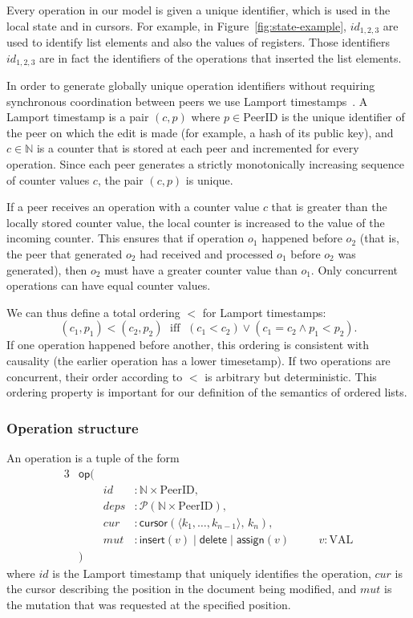 \documentclass[a4paper,twocolumn,10pt]{article}
\begin{document}
Every operation in our model is given a unique identifier, which is used in the local state and in cursors. For example, in Figure~\ref{fig:state-example}, $\mathit{id}_{1,2,3}$ are used to identify list elements and also the values of registers. Those identifiers $\mathit{id}_{1,2,3}$ are in fact the identifiers of the operations that inserted the list elements.

In order to generate globally unique operation identifiers without requiring synchronous coordination between peers we use Lamport timestamps~\cite{Lamport:1978jq}. A Lamport timestamp is a pair $(c, p)$ where $p \in \mathrm{PeerID}$ is the unique identifier of the peer on which the edit is made (for example, a hash of its public key), and $c \in \mathbb{N}$ is a counter that is stored at each peer and incremented for every operation. Since each peer generates a strictly monotonically increasing sequence of counter values $c$, the pair $(c, p)$ is unique.

If a peer receives an operation with a counter value $c$ that is greater than the locally stored counter value, the local counter is increased to the value of the incoming counter. This ensures that if operation $o_1$ happened before $o_2$ (that is, the peer that generated $o_2$ had received and processed $o_1$ before $o_2$ was generated), then $o_2$ must have a greater counter value than $o_1$. Only concurrent operations can have equal counter values.

We can thus define a total ordering $<$ for Lamport timestamps:
\[ (c_1, p_1) < (c_2, p_2) \;\text{ iff }\; (c_1 < c_2) \vee (c_1 = c_2 \wedge p_1 < p_2). \]
If one operation happened before another, this ordering is consistent with causality (the earlier operation has a lower timesetamp). If two operations are concurrent, their order according to $<$ is arbitrary but deterministic. This ordering property is important for our definition of the semantics of ordered lists.

\subsubsection{Operation structure}

An operation is a tuple of the form
\begin{alignat*}{3}
& \mathsf{op}( \\
&& \mathit{id} &: \mathbb{N} \times \mathrm{PeerID}, \\
&& \mathit{deps} &: \mathcal{P}(\mathbb{N} \times \mathrm{PeerID}), \\
&& \mathit{cur} &: \mathsf{cursor}(\langle k_1, \dots, k_{n-1} \rangle,\, k_n), \\
&& \mathit{mut} &: \mathsf{insert}(v) \mid \mathsf{delete} \mid \mathsf{assign}(v) && \quad v: \mathrm{VAL} \\
& )
\end{alignat*}
where $\mathit{id}$ is the Lamport timestamp that uniquely identifies the operation, $\mathit{cur}$ is the cursor describing the position in the document being modified, and $\mathit{mut}$ is the mutation that was requested at the specified position.
\end{document}
